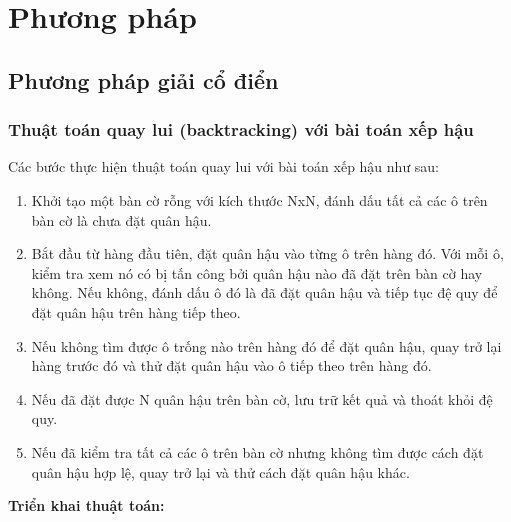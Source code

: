 

\chapter{Phương pháp}
\section{Phương pháp giải cổ điển}

\subsection{Thuật toán quay lui (backtracking) với bài toán xếp hậu}
Các bước thực hiện thuật toán quay lui với bài toán xếp hậu như sau:
\begin{enumerate}
    \item Khởi tạo một bàn cờ rỗng với kích thước NxN, đánh dấu tất cả các ô trên bàn cờ là chưa đặt quân hậu.
    \item Bắt đầu từ hàng đầu tiên, đặt quân hậu vào từng ô trên hàng đó. Với mỗi ô, kiểm tra xem nó có bị tấn công bởi quân hậu nào đã đặt trên bàn cờ hay không. Nếu không, đánh dấu ô đó là đã đặt quân hậu và tiếp tục đệ quy để đặt quân hậu trên hàng tiếp theo.
    \item Nếu không tìm được ô trống nào trên hàng đó để đặt quân hậu, quay trở lại hàng trước đó và thử đặt quân hậu vào ô tiếp theo trên hàng đó.
    \item Nếu đã đặt được N quân hậu trên bàn cờ, lưu trữ kết quả và thoát khỏi đệ quy.
    \item Nếu đã kiểm tra tất cả các ô trên bàn cờ nhưng không tìm được cách đặt quân hậu hợp lệ, quay trở lại và thử cách đặt quân hậu khác.
\end{enumerate}

\textbf{Triển khai thuật toán:}

